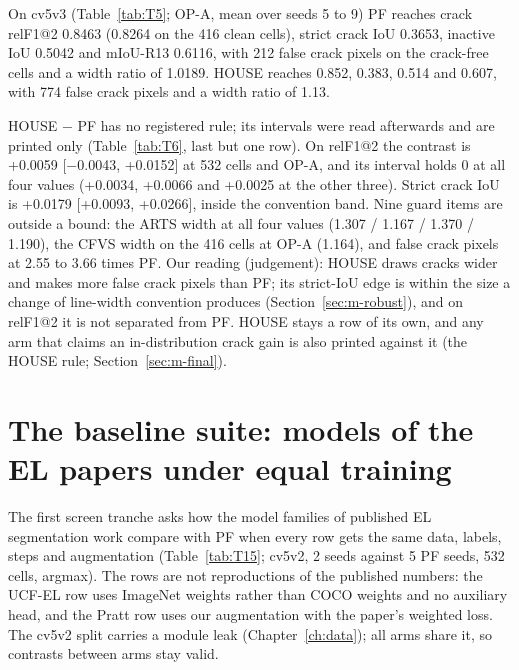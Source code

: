 On cv5v3 (Table~\ref{tab:T5}; OP-A, mean over seeds 5 to 9) PF reaches crack relF1@2 0.8463 (0.8264 on the 416 clean cells),
strict crack IoU 0.3653, inactive IoU 0.5042 and mIoU-R13 0.6116, with 212 false crack pixels on the crack-free cells and a
width ratio of 1.0189. HOUSE reaches 0.852, 0.383, 0.514 and 0.607, with 774 false crack pixels and a width ratio of 1.13.

HOUSE $-$ PF has no registered rule; its intervals were read afterwards and are printed only (Table~\ref{tab:T6}, last but one
row). On relF1@2 the contrast is +0.0059 [$-$0.0043, +0.0152] at 532 cells and OP-A, and its interval holds 0 at all four values
(+0.0034, +0.0066 and +0.0025 at the other three). Strict crack IoU is +0.0179 [+0.0093, +0.0266], inside the convention band.
Nine guard items are outside a bound: the ARTS width at all four values (1.307 / 1.167 / 1.370 / 1.190), the CFVS width on the
416 cells at OP-A (1.164), and false crack pixels at 2.55 to 3.66 times PF. Our reading (judgement): HOUSE draws cracks wider
and makes more false crack pixels than PF; its strict-IoU edge is within the size a change of line-width convention produces
(Section~\ref{sec:m-robust}), and on relF1@2 it is not separated from PF. HOUSE stays a row of its own, and any arm that claims
an in-distribution crack gain is also printed against it (the HOUSE rule; Section~\ref{sec:m-final}).

\section{The baseline suite: models of the EL papers under equal training}\label{sec:m-suite}

The first screen tranche asks how the model families of published EL segmentation work compare with PF when every row gets the
same data, labels, steps and augmentation (Table~\ref{tab:T15}; cv5v2, 2 seeds against 5 PF seeds, 532 cells, argmax). The
rows are not reproductions of the published numbers: the UCF-EL row uses ImageNet weights rather than COCO weights and no
auxiliary head, and the Pratt row uses our augmentation with the paper's weighted loss. The cv5v2 split carries a module leak
(Chapter~\ref{ch:data}); all arms share it, so contrasts between arms stay valid.

